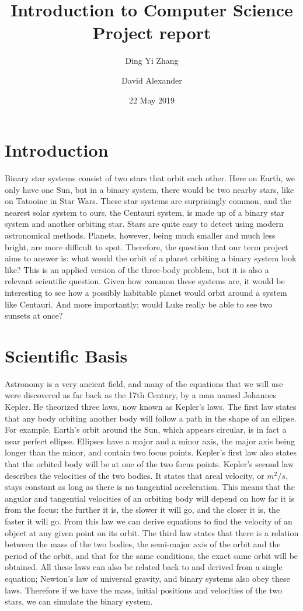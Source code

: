 \documentclass[12pt]{article}
\title{Introduction to Computer Science\\ Project report}
\author{Ding Yi Zhang
\and David Alexander}
\date{22 May 2019}
\begin{document}
\maketitle


\section{Introduction}
Binary star systems consist of two stars that orbit each other. Here on Earth, we only have one Sun, but in a binary system, there would be two nearby stars, like on Tatooine in Star Wars. These star systems are surprisingly common, and the nearest solar system to ours, the Centauri system, is made up of a binary star system and another orbiting star. Stars are quite easy to detect using modern astronomical methods. Planets, however, being much smaller and much less bright, are more difficult to spot. Therefore, the question that our term project aims to answer is: what would the orbit of a planet orbiting a binary system look like? This is an applied version of the three-body problem, but it is also a relevant scientific question. Given how common these systems are, it would be interesting to see how a possibly habitable planet would orbit around a system like Centauri. And more importantly; would Luke really be able to see two sunsets at once?

\section{Scientific Basis}
Astronomy is a very ancient field, and many of the equations that we will use were discovered as far back as the 17th Century, by a man named Johannes Kepler. He theorized three laws, now known as Kepler’s laws. The first law states that any body orbiting another body will follow a path in the shape of an ellipse. For example, Earth’s orbit around the Sun, which appears circular, is in fact a near perfect ellipse. Ellipses have a major and a minor axis, the major axis being longer than the minor, and contain two focus points. Kepler’s first law also states that the orbited body will be at one of the two focus points. Kepler’s second law describes the velocities of the two bodies. It states that areal velocity, or $m^2/s$, stays constant as long as there is no tangential acceleration. This means that the angular and tangential velocities of an orbiting body will depend on how far it is from the focus: the further it is, the slower it will go, and the closer it is, the faster it will go. From this law we can derive equations to find the velocity of an object at any given point on its orbit. The third law states that there is a relation between the mass of the two bodies, the semi-major axis of the orbit and the period of the orbit, and that for the same conditions, the exact same orbit will be obtained. All these laws can also be related back to and derived from a single equation; Newton’s law of universal gravity, and binary systems also obey these laws. Therefore if we have the mass, initial positions and velocities of the two stars, we can simulate the binary system.
\end{document}
